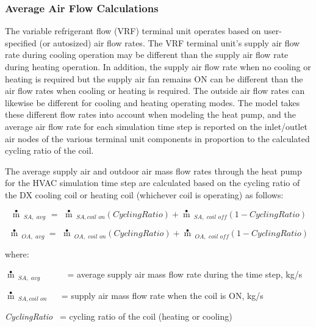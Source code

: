 \subsubsection{Average Air Flow Calculations}\label{average-air-flow-calculations}

The variable refrigerant flow (VRF) terminal unit operates based on user-specified (or autosized) air flow rates. The VRF terminal unit's supply air flow rate during cooling operation may be different than the supply air flow rate during heating operation. In addition, the supply air flow rate when no cooling or heating is required but the supply air fan remains ON can be different than the air flow rates when cooling or heating is required. The outside air flow rates can likewise be different for cooling and heating operating modes. The model takes these different flow rates into account when modeling the heat pump, and the average air flow rate for each simulation time step is reported on the inlet/outlet air nodes of the various terminal unit components in proportion to the calculated cycling ratio of the coil.

The average supply air and outdoor air mass flow rates through the heat pump for the HVAC simulation time step are calculated based on the cycling ratio of the DX cooling coil or heating coil (whichever coil is operating) as follows:

\begin{equation}
\mathop m\limits^ \bullet  {\,_{SA,\,\,avg}}\,\, = \,\,\mathop m\limits^ \bullet  {\,_{SA,coil\,\,on}}\left( {CyclingRatio} \right) + \mathop m\limits^ \bullet  {\,_{SA,\,\,coil\,\,off}}\left( {1 - CyclingRatio} \right)
\end{equation}

\begin{equation}
\mathop m\limits^ \bullet  {\,_{OA,\,\,avg\,\,}} = \,\,\mathop m\limits^ \bullet  {\,_{OA,\,\,coil\,\,on}}\left( {CyclingRatio} \right) + \mathop m\limits^ \bullet  {\,_{OA,\,\,coil\,\,off}}\left( {1 - CyclingRatio} \right)
\end{equation}

where:

\(\mathop m\limits^ \bullet {\,_{SA,\,\,avg}}\) ~~~~~ = average supply air mass flow rate during the time step, kg/s

\(\mathop m\limits^ \bullet {\,_{SA,coil\,\,on}}\) ~~ = supply air mass flow rate when the coil is ON, kg/s

\emph{CyclingRatio}~ = cycling ratio of the coil (heating or cooling)

